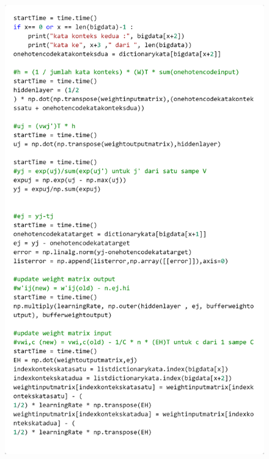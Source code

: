 \documentclass[12pt]{report}
\begin{document}
\begin{figure}[H]
\centering
\includegraphics[scale=0.3]{trainingcbow3}
\end{figure}
\end{document}
